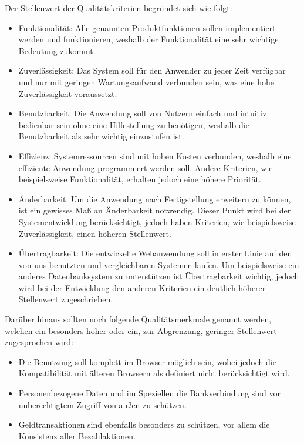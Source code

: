 \documentclass[a4paper]{scrreprt}
\begin{document}
Der Stellenwert der Qualitätskriterien begründet sich wie folgt:
    	\begin{itemize}
    		\item Funktionalität: Alle genannten Produktfunktionen sollen implementiert werden und funktionieren, weshalb der Funktionalität eine sehr wichtige Bedeutung zukommt.
    		\item Zuverlässigkeit: Das System soll für den Anwender zu jeder Zeit verfügbar und nur mit geringen Wartungsaufwand verbunden sein, was eine hohe Zuverlässigkeit voraussetzt.
    		\item Benutzbarkeit: Die Anwendung soll von Nutzern einfach und intuitiv bedienbar sein ohne eine Hilfestellung zu benötigen, weshalb die Benutzbarkeit als sehr wichtig einzustufen ist.
    		\item Effizienz: Systemressourcen sind mit hohen Kosten verbunden, weshalb eine effiziente Anwendung programmiert werden soll. Andere Kriterien, wie beispielsweise Funktionalität, erhalten jedoch eine höhere Priorität.
    		\item Änderbarkeit: Um die Anwendung nach Fertigstellung erweitern zu können, ist ein gewisses Maß an Änderbarkeit notwendig. Dieser Punkt wird bei der Systementwicklung berücksichtigt, jedoch haben Kriterien, wie beispielsweise Zuverlässigkeit, einen höheren Stellenwert.
    		\item Übertragbarkeit: Die entwickelte Webanwendung soll in erster Linie auf den von uns benutzten und vergleichbaren Systemen laufen. Um beispielsweise ein anderes Datenbanksystem zu unterstützen ist Übertragbarkeit wichtig, jedoch wird bei der Entwicklung den anderen Kriterien ein deutlich höherer Stellenwert zugeschrieben.
    	\end{itemize}
	Darüber hinaus sollten noch folgende Qualitätsmerkmale genannt werden, welchen ein besonders hoher oder ein, zur Abgrenzung, geringer Stellenwert zugesprochen wird:
		\begin{itemize}
		 	\item Die Benutzung soll komplett im Browser möglich sein, wobei jedoch die Kompatibilität mit älteren Browsern als definiert nicht berücksichtigt wird.
		 	\item Personenbezogene Daten und im Speziellen die Bankverbindung sind vor unberechtigtem Zugriff von außen zu schützen.
		 	\item Geldtransaktionen sind ebenfalls besonders zu schützen, vor allem die \gls{Konsistenz} aller Bezahlaktionen.
 \end{itemize}
 
\end{document}
